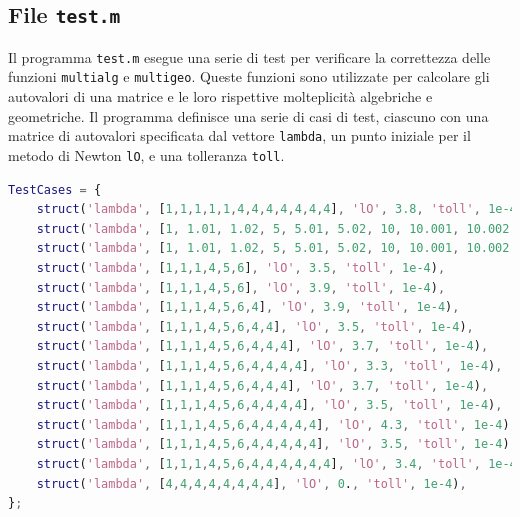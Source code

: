 \documentclass[12pt]{article}
\begin{document}
    \subsection{File \texttt{test.m}}
    Il programma \texttt{test.m} esegue una serie di test per verificare la correttezza delle funzioni \texttt{multialg} e \texttt{multigeo}. Queste funzioni sono utilizzate per calcolare gli autovalori di una matrice e le loro rispettive molteplicità algebriche e geometriche.
    Il programma definisce una serie di casi di test, ciascuno con una matrice di autovalori specificata dal vettore \texttt{lambda}, un punto iniziale per il metodo di Newton \texttt{lO}, e una tolleranza \texttt{toll}.
    \begin{lstlisting}[language=Matlab, frame=single, caption={Test Cases}, captionpos=b]         
TestCases = {
    struct('lambda', [1,1,1,1,1,4,4,4,4,4,4,4], 'lO', 3.8, 'toll', 1e-4),
    struct('lambda', [1, 1.01, 1.02, 5, 5.01, 5.02, 10, 10.001, 10.002, 10.003], 'lO', 10.1, 'toll', 1e-4),
    struct('lambda', [1, 1.01, 1.02, 5, 5.01, 5.02, 10, 10.001, 10.002, 10.003], 'lO', 1.0125, 'toll', 1e-4),
    struct('lambda', [1,1,1,4,5,6], 'lO', 3.5, 'toll', 1e-4),
    struct('lambda', [1,1,1,4,5,6], 'lO', 3.9, 'toll', 1e-4),
    struct('lambda', [1,1,1,4,5,6,4], 'lO', 3.9, 'toll', 1e-4),
    struct('lambda', [1,1,1,4,5,6,4,4], 'lO', 3.5, 'toll', 1e-4),
    struct('lambda', [1,1,1,4,5,6,4,4,4], 'lO', 3.7, 'toll', 1e-4), 
    struct('lambda', [1,1,1,4,5,6,4,4,4,4], 'lO', 3.3, 'toll', 1e-4), 
    struct('lambda', [1,1,1,4,5,6,4,4,4], 'lO', 3.7, 'toll', 1e-4),
    struct('lambda', [1,1,1,4,5,6,4,4,4,4], 'lO', 3.5, 'toll', 1e-4),
    struct('lambda', [1,1,1,4,5,6,4,4,4,4,4], 'lO', 4.3, 'toll', 1e-4), 
    struct('lambda', [1,1,1,4,5,6,4,4,4,4,4], 'lO', 3.5, 'toll', 1e-4), 
    struct('lambda', [1,1,1,4,5,6,4,4,4,4,4,4], 'lO', 3.4, 'toll', 1e-4),
    struct('lambda', [4,4,4,4,4,4,4,4], 'lO', 0., 'toll', 1e-4),
};
    \end{lstlisting}
    \newpage
\end{document}

